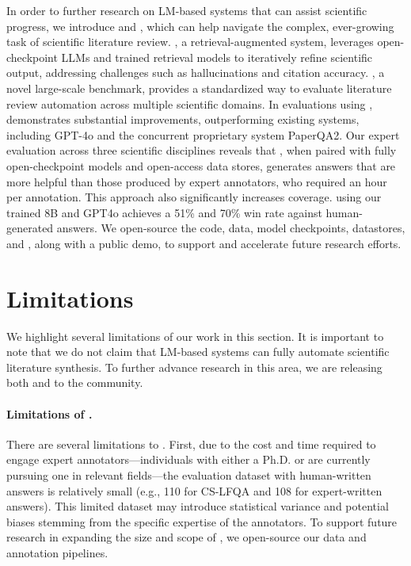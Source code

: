 In order to further research on LM-based systems that can assist scientific progress, we introduce \model and \data, which can help navigate the complex, ever-growing task of scientific literature review. 
\model, a retrieval-augmented system, leverages open-checkpoint LLMs and trained retrieval models to iteratively refine scientific output, addressing challenges such as hallucinations and citation accuracy. 
\data, a novel large-scale benchmark, provides a standardized way to evaluate literature review automation across multiple scientific domains. 
In evaluations using \data, \model demonstrates substantial improvements, outperforming existing systems, including GPT-4o and the concurrent proprietary system PaperQA2. Our expert evaluation across three scientific disciplines reveals that \data, when paired with fully open-checkpoint models and open-access data stores, generates answers that are more helpful than those produced by expert annotators, who required an hour per annotation. This approach also significantly increases coverage. 
\model using our trained 8B and GPT4o  achieves a 51\% and 70\% win rate against human-generated answers. 
We open-source the \model code, data, model checkpoints, datastores, and \data, along with a public demo, to support and accelerate future research efforts. 

\section*{Limitations}
We highlight several limitations of our work in this section. It is important to note that we do not claim that LM-based systems can fully automate scientific literature synthesis. 
To further advance research in this area, we are releasing both \data and \model to the community. 

\paragraph{Limitations of \data.}
There are several limitations to \data. First, due to the cost and time required to engage expert annotators—individuals with either a Ph.D. or are currently pursuing one in relevant fields—the evaluation dataset with human-written answers is relatively small (e.g., 110 for CS-LFQA and 108 for expert-written answers). This limited dataset may introduce statistical variance and potential biases stemming from the specific expertise of the annotators. To support future research in expanding the size and scope of \data, we open-source our data and annotation pipelines.

